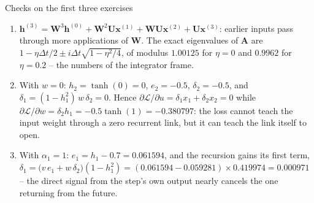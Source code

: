 \documentclass[10pt,aspectratio=169]{beamer}
\begin{document}
\begin{frame}{Checks on the first three exercises}
\scriptsize
\begin{enumerate}
  \item $\bm{h}^{(3)}=\bm{W}^3\bm{h}^{(0)}+\bm{W}^2\bm{U}\bm{x}^{(1)}+\bm{W}\bm{U}\bm{x}^{(2)}+\bm{U}\bm{x}^{(3)}$:
        earlier inputs pass through more applications of $\bm{W}$.  The
        exact eigenvalues of $\bm{A}$ are
        $1-\eta\Delta t/2\pm i\Delta t\sqrt{1-\eta^2/4}$, of modulus
        $1.00125$ for $\eta=0$ and $0.9962$ for $\eta=0.2$ -- the numbers of
        the integrator frame.
  \item With $w=0$: $h_2=\tanh(0)=0$, $e_2=-0.5$, $\delta_2=-0.5$, and
        $\delta_1=(1-h_1^2)\,w\,\delta_2=0$.  Hence
        $\partial\mathcal{L}/\partial u=\delta_1x_1+\delta_2x_2=0$ while
        $\partial\mathcal{L}/\partial w=\delta_2h_1=-0.5\tanh(1)=-0.380797$:
        the loss cannot teach the input weight through a zero recurrent link,
        but it can teach the link itself to open.
  \item With $\alpha_1=1$: $e_1=h_1-0.7=0.061594$, and the recursion gains
        its first term, $\delta_1=\bigl(v\,e_1+w\,\delta_2\bigr)(1-h_1^2)
        =(0.061594-0.059281)\times0.419974=0.000971$ -- the direct signal
        from the step's own output nearly cancels the one returning from the
        future.
\end{enumerate}
\end{frame}
\end{document}
